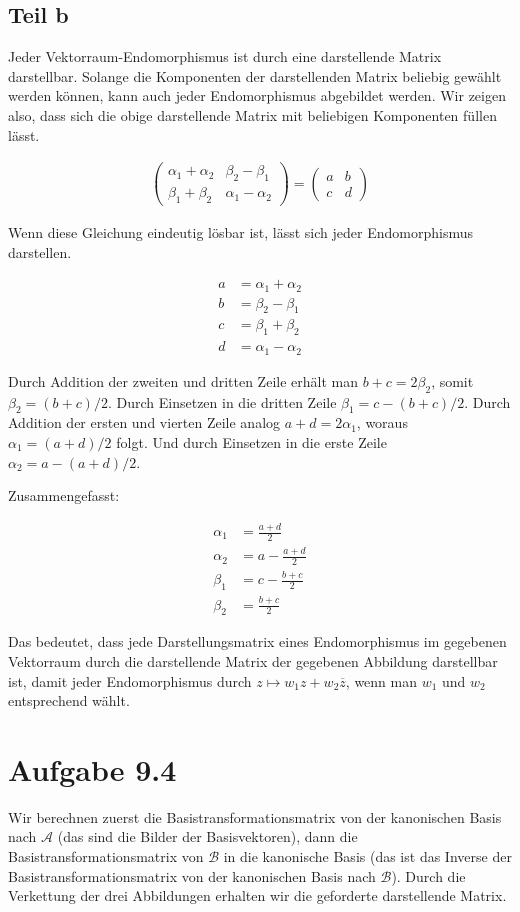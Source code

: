 \documentclass[a4paper,german,12pt,smallheadings]{scrartcl}
\begin{document}
\subsection*{Teil b}

Jeder Vektorraum-Endomorphismus ist durch eine darstellende Matrix darstellbar.
Solange die Komponenten der darstellenden Matrix beliebig gewählt werden
können, kann auch jeder Endomorphismus abgebildet werden. Wir zeigen also, dass
sich die obige darstellende Matrix mit beliebigen Komponenten füllen lässt.

\begin{align*}
  \begin{pmatrix} \alpha_1+\alpha_2 & \beta_2 - \beta_1 \\ \beta_1+\beta_2 & \alpha_1-\alpha_2 \end{pmatrix} = \begin{pmatrix} a & b \\ c & d\end{pmatrix}
\end{align*}

Wenn diese Gleichung eindeutig lösbar ist, lässt sich jeder Endomorphismus
darstellen.

\begin{align*}
  a &= \alpha_1 + \alpha_2 \\
  b &= \beta_2 - \beta_1 \\
  c &= \beta_1+\beta_2 \\
  d &= \alpha_1 - \alpha_2
\end{align*}

Durch Addition der zweiten und dritten Zeile erhält man $b+c = 2\beta_2$, somit
$\beta_2 = (b+c)/2$. Durch Einsetzen in die dritten Zeile $\beta_1 = c -
(b+c)/2$. Durch Addition der ersten und vierten Zeile analog $a+d = 2\alpha_1$,
woraus $\alpha_1 = (a+d)/2$ folgt. Und durch Einsetzen in die erste Zeile
$\alpha_2 = a - (a+d)/2$.

Zusammengefasst:

\begin{align*}
  \alpha_1 &= \frac{a+d}{2} \\
  \alpha_2 &= a - \frac{a+d}{2} \\
  \beta_1  &= c - \frac{b+c}{2} \\
  \beta_2  &= \frac{b+c}{2}
\end{align*}

Das bedeutet, dass jede Darstellungsmatrix eines Endomorphismus im gegebenen
Vektorraum durch die darstellende Matrix der gegebenen Abbildung darstellbar
ist, damit jeder Endomorphismus durch $z \mapsto w_1z + w_2\overline{z}$, wenn
man $w_1$ und $w_2$ entsprechend wählt.

\section*{Aufgabe 9.4}
Wir berechnen zuerst die Basistransformationsmatrix von der kanonischen Basis
nach $\mathcal{A}$ (das sind die Bilder der Basisvektoren), dann die
Basistransformationsmatrix von $\mathcal{B}$ in die kanonische Basis (das ist
das Inverse der Basistransformationsmatrix von der kanonischen Basis nach
$\mathcal{B}$). Durch die Verkettung der drei Abbildungen erhalten wir die
geforderte darstellende Matrix.
\end{document}
